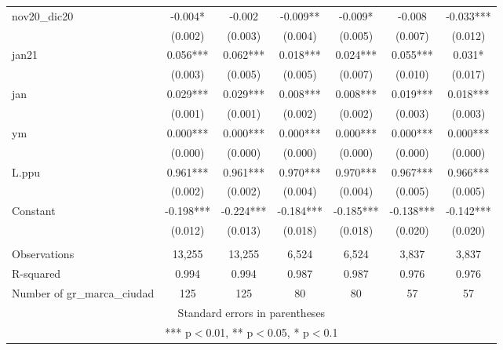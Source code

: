 \begin{tabular}{lcccccc}
nov20\_dic20 & -0.004* & -0.002 & -0.009** & -0.009* & -0.008 & -0.033*** \\
 & (0.002) & (0.003) & (0.004) & (0.005) & (0.007) & (0.012) \\
jan21 & 0.056*** & 0.062*** & 0.018*** & 0.024*** & 0.055*** & 0.031* \\
 & (0.003) & (0.005) & (0.005) & (0.007) & (0.010) & (0.017) \\
jan & 0.029*** & 0.029*** & 0.008*** & 0.008*** & 0.019*** & 0.018*** \\
 & (0.001) & (0.001) & (0.002) & (0.002) & (0.003) & (0.003) \\
ym & 0.000*** & 0.000*** & 0.000*** & 0.000*** & 0.000*** & 0.000*** \\
 & (0.000) & (0.000) & (0.000) & (0.000) & (0.000) & (0.000) \\
L.ppu & 0.961*** & 0.961*** & 0.970*** & 0.970*** & 0.967*** & 0.966*** \\
 & (0.002) & (0.002) & (0.004) & (0.004) & (0.005) & (0.005) \\
Constant & -0.198*** & -0.224*** & -0.184*** & -0.185*** & -0.138*** & -0.142*** \\
 & (0.012) & (0.013) & (0.018) & (0.018) & (0.020) & (0.020) \\
 &  &  &  &  &  &  \\
Observations & 13,255 & 13,255 & 6,524 & 6,524 & 3,837 & 3,837 \\
R-squared & 0.994 & 0.994 & 0.987 & 0.987 & 0.976 & 0.976 \\
 Number of gr\_marca\_ciudad & 125 & 125 & 80 & 80 & 57 & 57 \\ \hline
\multicolumn{7}{c}{ Standard errors in parentheses} \\
\multicolumn{7}{c}{ *** p$<$0.01, ** p$<$0.05, * p$<$0.1} \\
\end{tabular}
